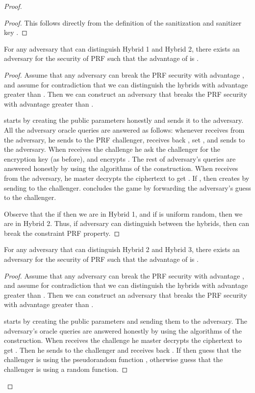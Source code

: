 \documentclass{llncs}
\begin{document}
\begin{proof}
\begin{proof}
This follows directly from the definition of the sanitization and sanitizer key .
\end{proof}

\begin{claim} \label{claim:ACE_nowrite_PRF_1}
For any adversary  that can distinguish Hybrid 1 and Hybrid 2, there exists an adversary  for the security of PRF  such that the advantage of  is 
.
\end{claim}

\begin{proof}
Assume that any adversary can break the PRF security with advantage , and assume for contradiction that we can distinguish the hybrids with advantage greater than . Then we can construct an adversary  that breaks the PRF security with advantage greater than .

 starts by creating the public parameters honestly and sends it to the adversary. 
All the adversary oracle queries are answered as follows: whenever  receives  from the adversary, he sends  to the PRF challenger, receives back , set , and sends  to the adversary. 
When  receives the challenge  he ask the challenger for the encryption key (as before), and encrypts . The rest of adversary's queries are answered honestly by using the algorithms of the construction.
When  receives  from the adversary, he master decrypts the ciphertext to get . If , then  creates  by sending  to the challenger.
 concludes the game by forwarding the adversary's guess  to the challenger.

Observe that the if  then we are in Hybrid 1, and if  is uniform random, then we are in Hybrid 2. 
Thus, if adversary  can distinguish between the hybrids, then  can break the constraint PRF property. 
\end{proof}


\begin{claim} 
For any adversary  that can distinguish Hybrid 2 and Hybrid 3,
there exists an adversary  for the security of PRF  such that the advantage of  is 
.
\end{claim}

\begin{proof}
Assume that any adversary can break the PRF security with advantage , and assume for contradiction that we can distinguish the hybrids with advantage greater than . Then we can construct an adversary  that breaks the PRF security with advantage greater than .

 starts by creating the public parameters and sending them to the adversary. The adversary's oracle queries are answered honestly by using the algorithms of the construction.
When  receives the challenge  he master decrypts the ciphertext to get . Then he sends  to the challenger and receives back . If  then  guess that the challenger is using the pseudorandom function , otherwise  guess that the challenger is using a random function.


\end{proof}
\end{proof}
\end{document}

